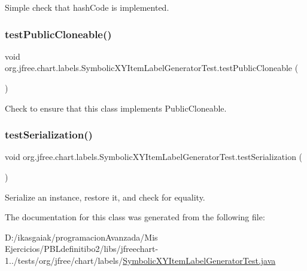 Simple check that hash\+Code is implemented. \mbox{\label{classorg_1_1jfree_1_1chart_1_1labels_1_1_symbolic_x_y_item_label_generator_test_a1efabbfac6579aaa85ee814254ae7864}} 
\subsubsection{\texorpdfstring{test\+Public\+Cloneable()}{testPublicCloneable()}}
{\footnotesize\ttfamily void org.\+jfree.\+chart.\+labels.\+Symbolic\+X\+Y\+Item\+Label\+Generator\+Test.\+test\+Public\+Cloneable (\begin{DoxyParamCaption}{ }\end{DoxyParamCaption})}

Check to ensure that this class implements Public\+Cloneable. \mbox{\label{classorg_1_1jfree_1_1chart_1_1labels_1_1_symbolic_x_y_item_label_generator_test_a6f3c2a79c6c7e838dc78ae6ebec39a12}} 
\subsubsection{\texorpdfstring{test\+Serialization()}{testSerialization()}}
{\footnotesize\ttfamily void org.\+jfree.\+chart.\+labels.\+Symbolic\+X\+Y\+Item\+Label\+Generator\+Test.\+test\+Serialization (\begin{DoxyParamCaption}{ }\end{DoxyParamCaption})}

Serialize an instance, restore it, and check for equality. 

The documentation for this class was generated from the following file\+:\begin{DoxyCompactItemize}
\item 
D\+:/ikasgaiak/programacion\+Avanzada/\+Mis Ejercicios/\+P\+B\+Ldefinitibo2/libs/jfreechart-\/1../tests/org/jfree/chart/labels/\mbox{\hyperlink{_symbolic_x_y_item_label_generator_test_8java}{Symbolic\+X\+Y\+Item\+Label\+Generator\+Test.\+java}}\end{DoxyCompactItemize}
